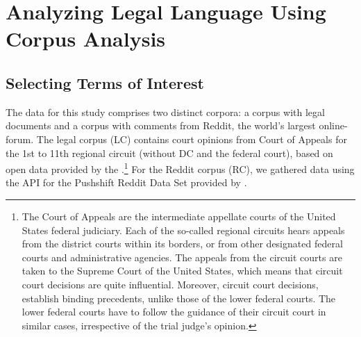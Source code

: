 \documentclass{article}
\begin{document}
\graphicspath{ {../../../output/03-results/plots/} }

\section{Analyzing Legal Language Using Corpus Analysis}

\subsection{Selecting Terms of Interest}

The data for this study comprises two distinct corpora: a corpus with legal documents and a corpus with comments from Reddit, the world's largest online-forum. The legal corpus (LC) contains court opinions from Court of Appeals for the 1st to 11th regional circuit (without DC and the federal court), based on open data provided by the \citet{FreeLawProject2020}.\footnote{The Court of Appeals are the intermediate appellate courts of the United States federal judiciary. Each of the so-called regional circuits hears appeals from the district courts within its borders, or from other designated federal courts and administrative agencies. The appeals from the circuit courts are taken to the Supreme Court of the United States, which means that circuit court decisions are quite influential. Moreover, circuit court decisions, establish binding precedents, unlike those of the lower federal courts. The lower federal courts have to follow the guidance of their circuit court in similar cases, irrespective of the trial judge's opinion.} For the Reddit corpus (RC), we gathered data using the API for the Pushshift Reddit Data Set provided by \citet{Baumgartner2020}. 
\end{document}
